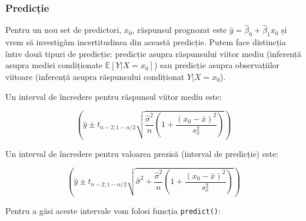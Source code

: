 \documentclass[]{article}
\begin{document}
\subsubsection{Predicție}\label{predictie}

Pentru un nou set de predictori, \(x_0\), răspunsul prognozat este
\(\hat{y} = \hat{\beta}_0+\hat{\beta}_1 x_0\) și vrem să investigăm
incertitudinea din această predicție. Putem face distincția între două
tipuri de predicție: predicție asupra răspunsului viitor mediu
(inferență asupra mediei condiționate \(\mathbb{E}[Y|X=x_0]\)) sau
predicție asupra observațiilor viitoare (inferență asupra răspunsului
condiționat \(Y|X=x_0\)).

Un interval de încredere pentru răspunsul viitor mediu este:

\[
\left(\hat y \pm t_{n-2;1-\alpha/2}\sqrt{\frac{\hat\sigma^2}{n}\left(1+\frac{(x_0-\bar x)^2}{s_x^2}\right)}\right)
\]

Un interval de încredere pentru valoarea prezisă (interval de predicție)
este:

\[
\left(\hat y \pm t_{n-2;1-\alpha/2}\sqrt{\hat\sigma^2+\frac{\hat\sigma^2}{n}\left(1+\frac{(x_0-\bar x)^2}{s_x^2}\right)}\right)
\]

Pentru a găsi aceste intervale vom folosi funcția \texttt{predict()}:
\end{document}

